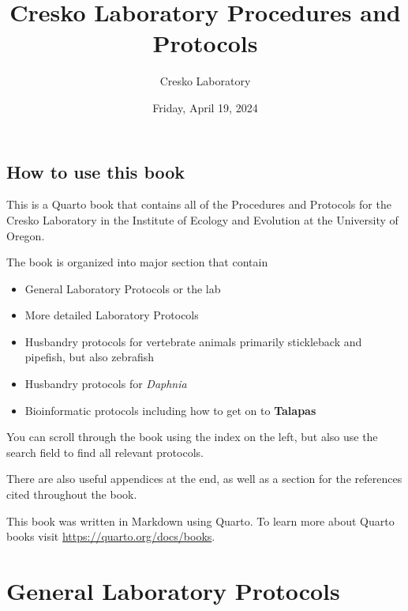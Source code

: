 \documentclass[
  letterpaper,
  DIV=11,
  numbers=noendperiod]{scrreprt}
\title{Cresko Laboratory Procedures and Protocols}
\author{Cresko Laboratory}
\date{Friday, April 19, 2024}
\renewcommand*\contentsname{Table of contents}
\newcommand\contentsname{Table of contents}
\begin{document}
\maketitle
\ifdefined\Shaded\renewenvironment{Shaded}{\begin{tcolorbox}[frame hidden, boxrule=0pt, enhanced, sharp corners, interior hidden, breakable, borderline west={3pt}{0pt}{shadecolor}]}{\end{tcolorbox}}\fi

\renewcommand*\contentsname{Table of contents}
{
\hypersetup{linkcolor=}
\setcounter{tocdepth}{2}
\tableofcontents
}

\hypertarget{how-to-use-this-book}{%
\chapter*{How to use this book}\label{how-to-use-this-book}}


This is a Quarto book that contains all of the Procedures and Protocols
for the Cresko Laboratory in the Institute of Ecology and Evolution at
the University of Oregon.

The book is organized into major section that contain

\begin{itemize}
\item
  General Laboratory Protocols or the lab
\item
  More detailed Laboratory Protocols
\item
  Husbandry protocols for vertebrate animals primarily stickleback and
  pipefish, but also zebrafish
\item
  Husbandry protocols for \emph{Daphnia}
\item
  Bioinformatic protocols including how to get on to \textbf{Talapas}
\end{itemize}

You can scroll through the book using the index on the left, but also
use the search field to find all relevant protocols.

There are also useful appendices at the end, as well as a section for
the references cited throughout the book.

This book was written in Markdown using Quarto. To learn more about
Quarto books visit \url{https://quarto.org/docs/books}.

\part{General Laboratory Protocols}
\end{document}
